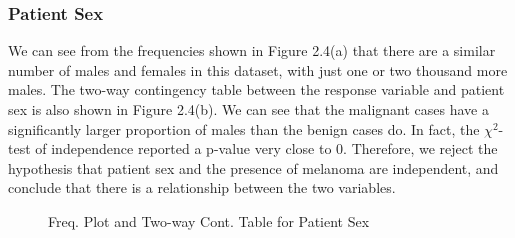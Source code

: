 \documentclass [MAS] {uclathes}
\begin{document}
\subsubsection*{Patient Sex}

We can see from the frequencies shown in Figure 2.4(a) that there are a similar number of males and females in this dataset, with just one or two thousand more males. The two-way contingency table between the response variable and patient sex is also shown in Figure 2.4(b). We can see that the malignant cases have a significantly larger proportion of males than the benign cases do. In fact, the $\chi^2$-test of independence reported a p-value very close to 0. Therefore, we reject the hypothesis that patient sex and the presence of melanoma are independent, and conclude that there is a relationship between the two variables.

\begin{figure}[h!tbp]
    \hspace*{\fill}
    \centering
    \hspace{1em}
    \hspace*{\fill}
    \label{fig:sex_eda_tab}
    \vspace{0cm}
    \caption{Freq. Plot and Two-way Cont. Table for Patient Sex}
    \end{figure}
\end{document}
